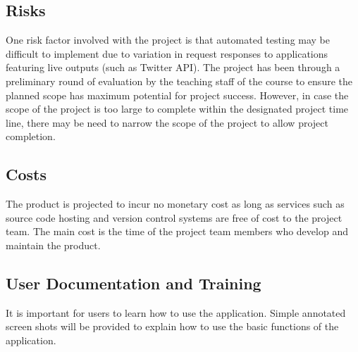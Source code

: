 \documentclass[12pt, titlepage]{article}
\begin{document}
\subsection{Risks}
One risk factor involved with the project is that automated testing may be difficult to implement due to variation in request responses to applications featuring live outputs (such as Twitter API). The project has been through a preliminary round of evaluation by the teaching staff of the course to ensure the planned scope has maximum potential for project success. However, in case the scope of the project is too large to complete within the designated project time line, there may be need to narrow the scope of the project to allow project completion.

\subsection{Costs}
The product is projected to incur no monetary cost as long as services such as source code hosting and version control systems are free of cost to the project team. The main cost is the time of the project team members who develop and maintain the product.

\subsection{User Documentation and Training}
It is important for users to learn how to use the application. Simple annotated screen shots will be provided to explain how to use the basic functions of the application.
\end{document}
